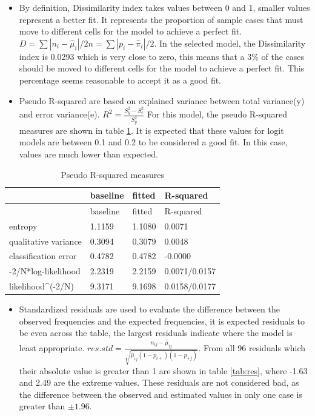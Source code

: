 \documentclass[
  12pt,
]{article}
\providecommand{\tightlist}{%
  \setlength{\itemsep}{0pt}\setlength{\parskip}{0pt}}
\begin{document}
\begin{itemize}
\item
  By definition, Dissimilarity index takes values between 0 and 1, smaller values represent a better fit. It represents the proportion of sample cases that must move to different cells for the model to achieve a perfect fit. \(D=\sum|n_i-\hat\mu_i|/2n=\sum|p_i-\hat\pi_i|/2\).
  In the selected model, the Dissimilarity index is 0.0293 which is very close to zero, this means that a 3\% of the cases should be moved to different cells for the model to achieve a perfect fit. This percentage seems reasonable to accept it as a good fit.
\item
  Pseudo R-squared are based on explained variance between total variance(y) and error variance(e). \(R^2=\frac{S_y^2-S_e^2}{S_y^2}\)
  For this model, the pseudo R-squared measures are shown in table \ref{tab:pseudo}. It is expected that these values for logit models are between 0.1 and 0.2 to be considered a good fit. In this case, values are much lower than expected.
\end{itemize}

\begin{longtable}[]{@{}llll@{}}
\caption{\label{tab:pseudo}Pseudo R-squared measures}\tabularnewline
\toprule
& baseline & fitted & R-squared\tabularnewline
\midrule
\endfirsthead
\toprule
& baseline & fitted & R-squared\tabularnewline
\midrule
\endhead
entropy & 1.1159 & 1.1080 & 0.0071\tabularnewline
qualitative variance & 0.3094 & 0.3079 & 0.0048\tabularnewline
classification error & 0.4782 & 0.4782 & -0.0000\tabularnewline
-2/N*log-likelihood & 2.2319 & 2.2159 & 0.0071/0.0157\tabularnewline
likelihood\^{}(-2/N) & 9.3171 & 9.1698 & 0.0158/0.0177\tabularnewline
\bottomrule
\end{longtable}

\begin{itemize}
\tightlist
\item
  Standardized residuals are used to evaluate the difference between the observed frequencies and the expected frequencies, it is expected residuals to be even across the table, the largest residuals indicate where the model is least appropriate. \(res.std=\frac{n_{ij}-\hat\mu_{ij}}{\sqrt{\hat\mu_{ij}(1-p_{i+})(1-p_{+j})}}\). From all 96 residuals which their absolute value is greater than 1 are shown in table \ref{tab:res}, where -1.63 and 2.49 are the extreme values. These residuals are not considered bad, as the difference between the observed and estimated values in only one case is greater than \(\pm1.96\).
\end{itemize}
\end{document}
